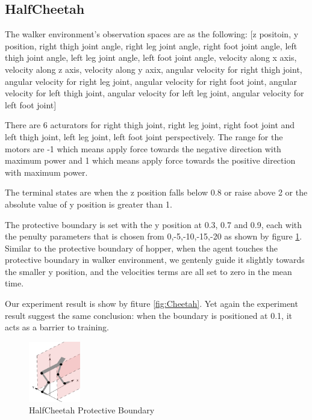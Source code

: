 \documentclass[journal]{IEEEtran}
\begin{document}
\subsection{HalfCheetah}
The walker environment's observation spaces are as the following: [z positoin, y position, right thigh joint angle, right leg joint angle, right foot joint angle, left thigh joint angle, left leg joint angle, left foot joint angle, velocity along x axis, velocity along z axis, velocity along y axix, angular velocity for right thigh joint, angular velocity for right leg joint, angular velocity for right foot joint, angular velocity for left thigh joint, angular velocity for left leg joint, angular velocity for left foot joint]

There are 6 acturators for right thigh joint, right leg joint, right foot joint and left thigh joint, left leg joint, left foot joint perspectively. The range for the motors are -1 which means apply force towards the negative direction with maximum power and 1 which means apply force towards the positive direction with maximum power.

The terminal states are when the z position falls below 0.8 or raise above 2 or the absolute value of y position is greater than 1.

The protective boundary is set with the y position at 0.3, 0.7 and 0.9, each with the penulty parameters that is chosen from 0,-5,-10,-15,-20 as shown by figure \ref{fig:cheetahPB}. Similar to the protective boundary of hopper, when the agent touches the protective boundary in walker environment, we gentenly guide it slightly towards the smaller y position, and the velocities terms are all set to zero in the mean time.

Our experiment result is show by fiture \ref{fig:Cheetah}. Yet again the experiment result suggest the same conclusion: when the boundary is positioned at 0.1, it acts as a barrier to training.

\begin{figure}
     \centering
      \includegraphics[width=0.2\textwidth]{cheetah.png}
      \caption{HalfCheetah Protective Boundary}
      \label{fig:cheetahPB}
\end{figure}
\end{document}
